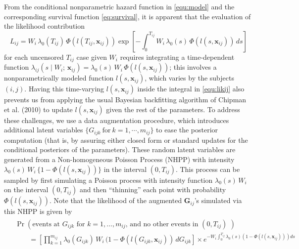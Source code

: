 \documentclass[11pt]{article}
\begin{document}
 From the conditional nonparametric hazard function in \eqref{equ:model} and the corresponding survival function \eqref{eq:survival}, it is apparent that the evaluation of the likelihood contribution 
  \begin{equation}
  L_{ij}=W_i \, \lambda_0(T_{ij}) \, \Phi(l(T_{ij},{\mathbf x_{ij}}))\exp\left[
  -\int_0^{T_{ij}}W_i \, \lambda_0(s)\,  \Phi(l(s,{\mathbf x_{ij}})) \, ds\right]
  \label{equ:likij}
 \end{equation}
 for each uncensored $T_{ij}$ case given $W_i$ requires integrating a time-dependent function $\lambda_{ij}(s \mid W_i ; \, \mathbf x_{ij}) = \lambda_0(s) \, W_i \, \Phi(l(s, \mathbf x_{ij}))$; this involves a nonparametrically modeled function $l(s, \mathbf x_{ij})$, which varies by the subjects $(i,j)$. Having this time-varying $l(s, \mathbf x_{ij})$ inside the integral in \eqref{equ:likij} also prevents us from applying the usual Bayesian backfitting algorithm of Chipman et al. (2010) to update $l(s, \mathbf x_{ij})$ given the rest of the parameters. To address these challenges, we use a data augmentation procedure, which introduces additional latent variables $\{G_{ijk} \ \text{for}\ k = 1,\cdots,m_{ij}\}$ to ease the posterior computation (that is, by assuring either closed form or standard updates for the conditional posteriors of the parameters). These random latent variables are generated from a Non-homogeneous Poisson Process (NHPP) with intensity
 \begin{math}
    \lambda_0(s) \, W_i \, \{1 - \Phi(l(s, \mathbf x_{ij}))\}
 \end{math}
 in the interval $(0, T_{ij})$. This process can be sampled by first simulating a Poisson process with intensity function $\lambda_0(s) \, W_i$ on the interval $(0, T_{ij})$ and then ``thinning'' each point with probability $\Phi(l(s, \mathbf x_{ij}))$. Note that the likelihood of the augmented $\mathbf G_{ij}$'s simulated via this NHPP is given by 
 \begin{align}
     \begin{split}
        &\Pr(\text{
           events at $G_{ijk}$ for $k = 1,\ldots, m_{ij}$, and no other events in $(0, T_{ij})$
         })
         \\
         &\qquad=
         \left[\prod_{k = 1}^{m_{ij}} 
         \lambda_0(G_{ijk}) \, W_i \, (1 - \Phi(l(G_{ijk}, \mathbf x_{ij})) \, dG_{ijk}
       \right]
       \times
       e^{-W_i \int_0^{T_{ij}}\lambda_0(s)(1-\Phi(l(s,{\mathbf x_{ij}})))ds}
        \label{eq:augl}
     \end{split}
 \end{align}
\end{document}
